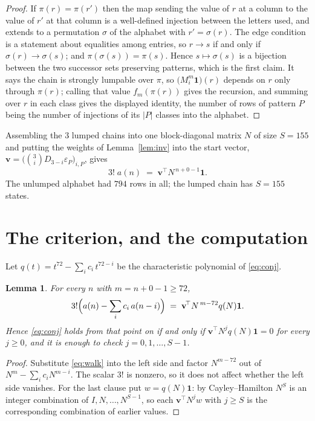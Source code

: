 \documentclass[11pt,a4paper]{article}
\theoremstyle{plain}
\newtheorem{lemma}[theorem]{Lemma}
\theoremstyle{definition}
\begin{document}
\begin{proof}
If $\pi(r)=\pi(r')$ then the map sending the value of $r$ at a column to the value of $r'$
at that column is a well-defined injection between the letters used, and extends to a
permutation $\sigma$ of the alphabet with $r'=\sigma(r)$. The edge condition is a statement
about equalities among entries, so $r\to s$ if and only if $\sigma(r)\to\sigma(s)$; and
$\pi(\sigma(s))=\pi(s)$. Hence $s\mapsto\sigma(s)$ is a bijection between the two successor
sets preserving patterns, which is the first claim. It says the chain is strongly lumpable
over $\pi$, so $\bigl(M_i^{m}\mathbf{1}\bigr)(r)$ depends on $r$ only through $\pi(r)$;
calling that value $f_m(\pi(r))$ gives the recursion, and summing over $r$ in each class
gives the displayed identity, the number of rows of pattern $P$ being the number of
injections of its $|P|$ classes into the alphabet.
\end{proof}

Assembling the $3$ lumped chains into one block-diagonal matrix $N$ of size $S=155$ and
putting the weights of Lemma~\ref{lem:inv} into the start vector,
$\mathbf{v}=\bigl(\binom{3}{i}D_{3-i}\varepsilon_P\bigr)_{i,P}$, gives
\begin{equation}\label{eq:walk}
3!\;a(n)\;=\;\mathbf{v}^{\!\top}N^{\,n+0-1}\mathbf{1} .
\end{equation}
The unlumped alphabet had $794$ rows in all; the lumped chain has $S=155$ states.

\section{The criterion, and the computation}

Let $q(t)=t^{72}-\sum_i c_i\,t^{72-i}$ be the characteristic polynomial of
\eqref{eq:conj}.

\begin{lemma}\label{lem:crit}
For every $n$ with $m=n+0-1\ge72$,
\[
3!\Bigl(a(n)-\sum_i c_i\,a(n-i)\Bigr)\;=\;\mathbf{v}^{\!\top}N^{\,m-72}q(N)\mathbf{1} .
\]
Hence \eqref{eq:conj} holds from that point on if and only if
$\mathbf{v}^{\!\top}N^{j}q(N)\mathbf{1}=0$ for every $j\ge0$, and it is enough to check
$j=0,1,\dots,S-1$.
\end{lemma}

\begin{proof}
Substitute \eqref{eq:walk} into the left side and factor $N^{m-72}$ out of
$N^{m}-\sum_i c_iN^{m-i}$. The scalar $3!$ is nonzero, so it does not affect whether
the left side vanishes. For the last clause put $w=q(N)\mathbf{1}$: by Cayley--Hamilton
$N^{S}$ is an integer combination of $I,N,\dots,N^{S-1}$, so each
$\mathbf{v}^{\!\top}N^{j}w$ with $j\ge S$ is the corresponding combination of earlier
values.
\end{proof}
\end{document}
